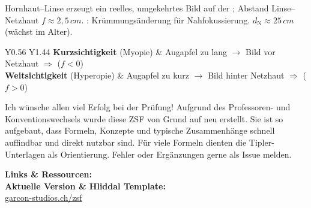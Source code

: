 \begin{runintext}
Hornhaut--Linse erzeugt ein reelles, umgekehrtes Bild auf der ; Abstand Linse--Netzhaut $f \approx 2{,}5\,\si{cm}$. : Krümmungsänderung für Nahfokussierung.  $d_{\mathrm{N}} \approx 25\,\si{cm}$ (wächst im Alter).
\end{runintext}

\begin{tablebox}
\begin{ZSFtableFlat}[\ZSFfontTableDense]{Y{0.56} Y{1.44}}
\textbf{Kurzsichtigkeit} \newline (Myopie) & Augapfel zu lang $\to$ Bild vor Netzhaut $\Rightarrow$  ($f<0$) \\
\textbf{Weitsichtigkeit} \newline (Hyperopie) & Augapfel zu kurz $\to$ Bild hinter Netzhaut $\Rightarrow$  ($f>0$) \\
\end{ZSFtableFlat}
\end{tablebox}


\ZSFStartClosingSubsection
{}

\begin{statementbox}
Ich wünsche allen viel Erfolg bei der Prüfung! Aufgrund des Professoren- und Konventionswechsels wurde diese ZSF von Grund auf neu erstellt. Sie ist so aufgebaut, dass Formeln, Konzepte und typische Zusammenhänge schnell auffindbar und direkt nutzbar sind. Für viele Formeln dienten die Tipler-Unterlagen als Orientierung. Fehler oder Ergänzungen gerne als Issue melden.

\ZSFgapS
\noindent\textbf{Links \& Ressourcen:}\\
\textbf{Aktuelle Version \& Hliddal Template:}\\
\href{https://garcon-studios.ch/zsf}{garcon-studios.ch/zsf}
\end{statementbox}
